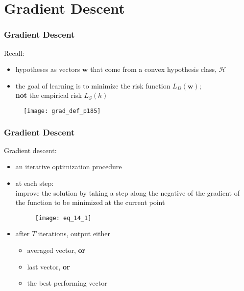 \section{Gradient Descent}

\begin{frame}
\frametitle{Gradient Descent}

Recall:\\
\begin{itemize}
\item hypotheses as vectors $\mathbf{w}$ that come from a convex hypothesis class, $\mathcal{H}$
\item the goal of learning is to minimize the risk function $L_D(\mathbf{w})$;\\
      \textbf{not} the empirical risk $L_S (h)$
\end{itemize}

\begin{figure}
    \centering
    \texttt{[image: grad\_def\_p185]}
\end{figure}


\end{frame}

\begin{frame}
\frametitle{Gradient Descent}
Gradient descent:
\begin{itemize}
\item an iterative optimization procedure
\item at each step: \\
    improve the solution by
    taking a step along the negative of the gradient of the function to be minimized at the current point

    \begin{figure}
    \centering
    \texttt{[image: eq\_14\_1]}
    \end{figure}
\item after $T$ iterations, output either
    \begin{itemize}
        \item averaged vector, \textbf{or}
        \item last vector, \textbf{or}
        \item the best performing vector
    \end{itemize}
\end{itemize}

\end{frame}


